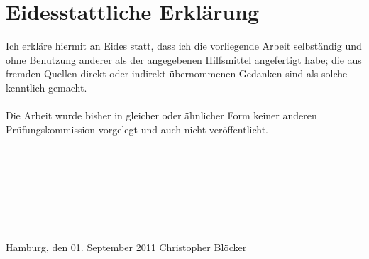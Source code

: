 \thispagestyle{empty}
\section*{Eidesstattliche Erklärung}

Ich erkläre hiermit an Eides statt, dass ich die vorliegende Arbeit selbständig und ohne Benutzung anderer als der angegebenen 
Hilfsmittel angefertigt habe; die aus fremden Quellen direkt oder indirekt übernommenen Gedanken sind  als solche kenntlich gemacht. \\
\\
Die Arbeit wurde bisher in gleicher oder ähnlicher Form keiner anderen Prü\-fungs\-kommis\-sion vorgelegt und auch nicht veröffentlicht. \\
\\
\\
\\
\\
\\
\hspace*{0.7\textwidth} \rule{0.3\textwidth}{0.4pt} \\
Hamburg, den 01. September 2011 \hfill Christopher Blöcker